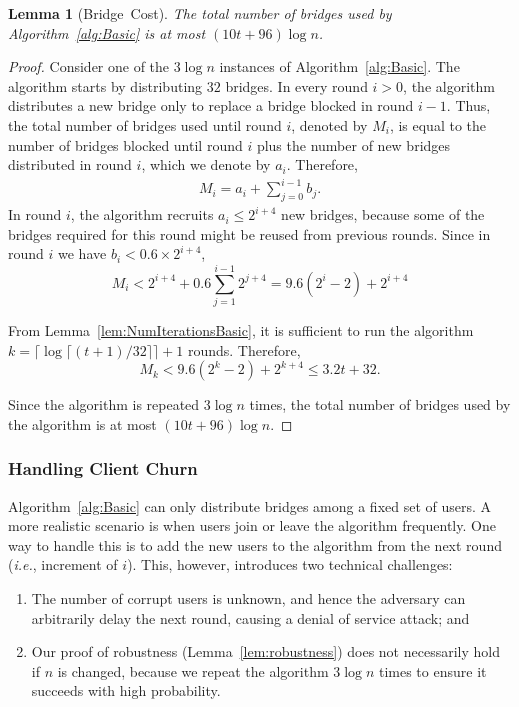 \documentclass[USenglish,oneside,twocolumn]{article}
\newcommand{\ie}{\textit{i.e.}}
\newtheorem{lemma}{Lemma}
\newcommand{\sfsize}{\fontsize{0.68\baselineskip}{0.68\baselineskip}\selectfont}
\newcommand{\sans}[1]{\textsf{\sfsize \mbox{#1}}}
\begin{document}
\begin{lemma}[\sans{Bridge Cost}] \label{lem:NumBridgesBasic}
	The total number of bridges used by Algorithm~\ref{alg:Basic} is at most ${(10t + 96)\log{n}}$. %
\end{lemma}
\begin{proof}
	Consider one of the $3\log{n}$ instances of Algorithm~\ref{alg:Basic}. The algorithm starts by distributing  $32$ bridges. In every round ${i > 0}$, the algorithm distributes a new bridge only to replace a bridge blocked in round ${i-1}$. Thus, the total number of bridges used until round $i$, denoted by $M_i$, is equal to the number of bridges blocked until round $i$ plus the number of new bridges distributed in round $i$, which we denote by $a_i$. Therefore,
	\begin{align}
		M_i = a_i + \sum_{j=0}^{i-1} b_j. \label{eq:NumBridges}
	\end{align}
	In round $i$, the algorithm recruits ${a_i \leq 2^{i+4}}$ new bridges, because some of the bridges required for this round might be reused from previous rounds. Since in round $i$ we have ${b_i < 0.6 \times 2^{i+4}}$,
	\[M_i < 2^{i+4} + 0.6\sum_{j=1}^{i-1} 2^{j+4} = 9.6(2^i - 2) + 2^{i+4}\]
	
	From Lemma~\ref{lem:NumIterationsBasic}, it is sufficient to run the algorithm ${k = \lceil \log{\lceil (t+1)/32 \rceil} \rceil + 1}$ rounds. Therefore,	
	\[M_k < 9.6(2^k - 2) + 2^{k+4} \leq 3.2t + 32.\]
	
	Since the algorithm is repeated $3\log{n}$ times, the total number of bridges used by the algorithm is at most ${(10t + 96)\log{n}}$. %
\end{proof}

\subsubsection{Handling Client Churn} \label{sec:churn}
Algorithm~\ref{alg:Basic} can only distribute bridges among a fixed set of users. A more realistic scenario is when users join or leave the algorithm frequently. One way to handle this is to add the new users to the algorithm from the next round (\ie, increment of $i$). This, however, introduces two technical challenges: 
\begin{enumerate}[itemsep=0.5em, topsep=0.6em]
	\item The number of corrupt users is unknown, and hence the adversary can arbitrarily delay the next round, causing a denial of service attack; and
	
	\item Our proof of robustness (Lemma~\ref{lem:robustness}) does not necessarily hold if $n$ is changed, because we repeat the algorithm $3\log{n}$ times to ensure it succeeds with high probability. 
\end{enumerate}
\end{document}
